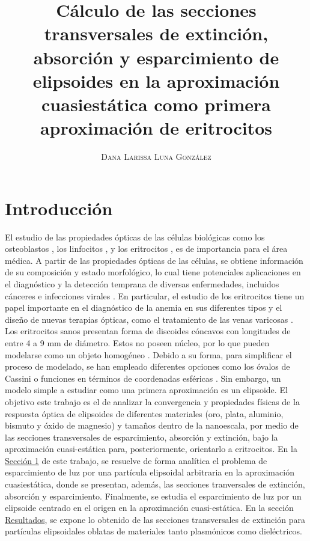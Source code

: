 \documentclass[paper=letter,11pt]{article}
\title{\vspace{-15mm}\fontsize{17pt}{1.25em}\selectfont\textbf{Cálculo de las secciones transversales de extinción, absorción y esparcimiento de elipsoides en la aproximación cuasiestática como primera aproximación de eritrocitos }} %
\author{
\large
{\textsc{ Dana Larissa Luna González}}\\[2mm]}
\date{}
\begin{document}
\maketitle %
\thispagestyle{fancy} %


\section{Introducción}
El estudio de las propiedades ópticas de las células biológicas como los osteoblastos \cite{Osteoblastos}, los linfocitos \cite{Linfocitos}, y los eritrocitos \cite{Blood}, es de importancia para el área médica. A partir de las propiedades ópticas de las células, se obtiene información de su composición y estado morfológico, lo cual tiene potenciales aplicaciones en el diagnóstico y la detección temprana de diversas enfermedades, incluidos cánceres e infecciones virales \cite{Linfocitos}. En particular, el estudio de los eritrocitos tiene un papel importante en el diagnóstico de la anemia en sus diferentes tipos y el diseño de nuevas terapias ópticas, como el tratamiento de las venas varicosas \cite{Blood}. \\

Los eritrocitos sanos presentan forma de discoides cóncavos con longitudes de entre 4 a 9 mm de diámetro. Estos no poseen núcleo, por lo que pueden modelarse como un objeto homogéneo \cite{Cassini}. Debido a su forma, para simplificar el proceso de modelado, se han empleado diferentes opciones como los óvalos de Cassini \cite{Cassini} o funciones en términos de coordenadas esféricas \cite{Esferico}. Sin embargo, un modelo simple a estudiar como una primera aproximación es un elipsoide. El objetivo este trabajo es el de analizar la convergencia y propiedades físicas de la respuesta óptica de elipsoides de diferentes materiales (oro, plata, aluminio, bismuto y óxido de magnesio) y tamaños dentro de la nanoescala, por medio de las secciones transversales de esparcimiento, absorción y extinción, bajo la aproximación cuasi-estática para, posteriormente, orientarlo a eritrocitos. En la \hyperlink{primera}{Sección 1} de este trabajo, se resuelve de forma analítica el problema de esparcimiento de luz por una partícula elipsoidal arbitraria en la aproximación cuasiestática, donde se presentan, además, las secciones tranversales de extinción, absorción y esparcimiento. Finalmente, se estudia el esparcimiento de luz por un elipsoide centrado en el origen en la aproximación cuasi-estática. En la sección \hyperlink{resultados}{Resultados}, se expone lo obtenido de las secciones transversales de extinción para partículas elipsoidales oblatas de materiales tanto plasmónicos como dieléctricos. 









\printbibliography



\end{document}

